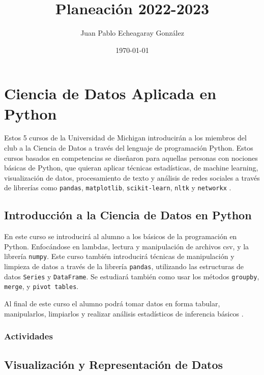 \documentclass{article}
\title{Planeación 2022-2023}
\author{Juan Pablo Echeagaray González}
\date{\today}
\begin{document}
    \begin{titlepage}
        \maketitle
    \end{titlepage}

    \tableofcontents
    \clearpage

    \section{Ciencia de Datos Aplicada en Python}

        Estos 5 cursos de la Universidad de Michigan introducirán a los miembros del club a la Ciencia de Datos a través del lenguaje de programación Python. Estos cursos basados en competencias se diseñaron para aquellas personas con nociones básicas de Python, que quieran aplicar técnicas estadísticas, de machine learning, visualización de datos, procesamiento de texto y análisis de redes sociales a través de librerías como \texttt{pandas}, \texttt{matplotlib}, \texttt{scikit-learn}, \texttt{nltk} y \texttt{networkx} \cite{applied-ds}.

        \subsection{Introducción a la Ciencia de Datos en Python}

            En este curso se introducirá al alumno a los básicos de la programación en Python. Enfocándose en lambdas, lectura y manipulación de archivos csv, y la librería \texttt{numpy}. Este curso también introducirá técnicas de manipulación y limpieza de datos a través de la librería \texttt{pandas}, utilizando las estructuras de datos \texttt{Series} y \texttt{DataFrame}. Se estudiará también como usar los métodos \texttt{groupby}, \texttt{merge}, y \texttt{pivot tables}.

            Al final de este curso el alumno podrá tomar datos en forma tabular, manipularlos, limpiarlos y realizar análisis estadísticos de inferencia básicos \cite{intro-ds}.

            \subsubsection{Actividades}

        \subsection{Visualización y Representación de Datos}
\end{document}
